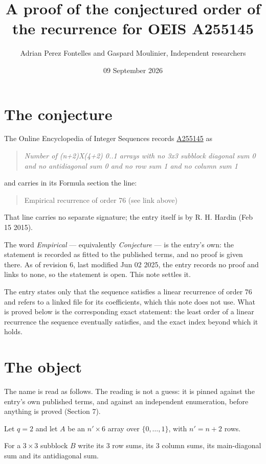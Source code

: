 \documentclass[11pt]{article}
\title{A proof of the conjectured order of the recurrence for OEIS A255145}
\author{Adrian Perez Fontelles and Gaspard Moulinier, Independent researchers}
\date{09 September 2026}
\theoremstyle{definition}
\begin{document}
\maketitle
\section{The conjecture}

The Online Encyclopedia of Integer Sequences records \href{https://oeis.org/A255145}{A255145} as

\begin{quote}\itshape Number of (n+2)X(4+2) 0..1 arrays with no 3x3 subblock diagonal sum 0 and no antidiagonal sum 0 and no row sum 1 and no column sum 1\end{quote}

and carries in its Formula section the line:

\begin{quote}\ttfamily Empirical recurrence of order 76 (see link above)\end{quote}

That line carries no separate signature; the entry itself is by R. H. Hardin (Feb 15 2015).

The word {\itshape Empirical} --- equivalently {\itshape Conjecture} --- is the entry's own: the statement is recorded as fitted to the published terms, and no proof is given there. As of revision 6, last modified Jun 02 2025, the entry records no proof and links to none, so the statement is open. This note settles it.

The entry states only that the sequence satisfies a linear recurrence of order $76$ and refers to a linked file for its coefficients, which this note does not use. What is proved below is the corresponding exact statement: the least order of a linear recurrence the sequence eventually satisfies, and the exact index beyond which it holds.

\section{The object}

The name is read as follows. The reading is not a guess: it is pinned against the entry's own published terms, and against an independent enumeration, before anything is proved (Section 7).

Let $q = 2$ and let $A$ be an $n' \times 6$ array over $\{0,\dots,1\}$, with $n' = n + 2$ rows.

For a $3\times3$ subblock $B$ write its 3 row sums, its 3 column sums, its main-diagonal sum and its antidiagonal sum.
\end{document}
